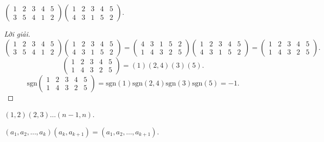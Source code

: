 \documentclass[class=linear-algebra,crop=false]{standalone}
\newcommand{\sgn}[1]{\text{sgn}\left({#1}\right)}
\begin{document}
\begin{exercise}
	$
		\begin{pmatrix}
			1 & 2 & 3 & 4 & 5 \\
			3 & 5 & 4 & 1 & 2
		\end{pmatrix}
		\begin{pmatrix}
			1 & 2 & 3 & 4 & 5 \\
			4 & 3 & 1 & 5 & 2
		\end{pmatrix}
	$.
\end{exercise}

\begin{proof}[Lời giải]
	\[
		\begin{pmatrix}
			1 & 2 & 3 & 4 & 5 \\
			3 & 5 & 4 & 1 & 2
		\end{pmatrix}
		\begin{pmatrix}
			1 & 2 & 3 & 4 & 5 \\
			4 & 3 & 1 & 5 & 2
		\end{pmatrix}
		=
		\begin{pmatrix}
			4 & 3 & 1 & 5 & 2 \\
			1 & 4 & 3 & 2 & 5
		\end{pmatrix}
		\begin{pmatrix}
			1 & 2 & 3 & 4 & 5 \\
			4 & 3 & 1 & 5 & 2
		\end{pmatrix}
		=
		\begin{pmatrix}
			1 & 2 & 3 & 4 & 5 \\
			1 & 4 & 3 & 2 & 5
		\end{pmatrix}.
	\]
	\[
		\begin{pmatrix}
			1 & 2 & 3 & 4 & 5 \\
			1 & 4 & 3 & 2 & 5
		\end{pmatrix}
		=
		(1)(2,4)(3)(5).
	\]
	\[
		\sgn{
			\begin{matrix}
				1 & 2 & 3 & 4 & 5 \\
				1 & 4 & 3 & 2 & 5
			\end{matrix}
		}
		= \sgn{1}\sgn{2,4}\sgn{3}\sgn{5}
		= -1.
	\]
\end{proof}

\begin{exercise}
	$(1,2)(2,3)\ldots (n-1,n)$.
\end{exercise}

\begin{lemma}\label{chapter3:cycles-product}
	$(a_{1}, a_{2}, \ldots, a_{k})(a_{k},a_{k+1}) = (a_{1},a_{2},\ldots, a_{k+1})$.
\end{lemma}
\end{document}
